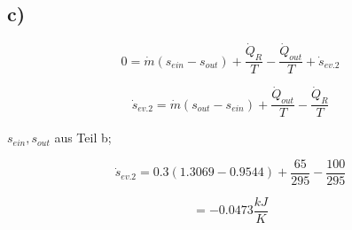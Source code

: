 

\subsection*{c)}

\begin{equation*}
0 = \dot{m} (s_{ein} - s_{out}) + \frac{\dot{Q}_R}{T} - \frac{\dot{Q}_{out}}{T} + \dot{s}_{ev.2}
\end{equation*}

\begin{equation*}
\dot{s}_{ev.2} = \dot{m} (s_{out} - s_{ein}) + \frac{\dot{Q}_{out}}{T} - \frac{\dot{Q}_R}{T}
\end{equation*}

$s_{ein}, s_{out}$ aus Teil b;

\begin{equation*}
\dot{s}_{ev.2} = 0.3 (1.3069 - 0.9544) + \frac{65}{295} - \frac{100}{295}
\end{equation*}

\begin{equation*}
= -0.0473 \frac{kJ}{K}
\end{equation*}